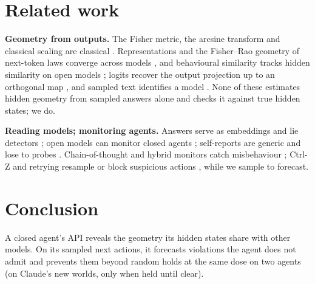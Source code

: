 \documentclass{article}
\theoremstyle{plain}
\theoremstyle{definition}
\begin{document}
\section{Related work}
\label{sec:related}
\textbf{Geometry from outputs.} The Fisher metric, the arcsine transform and classical scaling are classical \citep{cencov1982statistical,amari2016information,anscombe1948transformation,torgerson1952mds}. Representations and the Fisher--Rao geometry of next-token laws converge across models \citep{huh2024platonic,picozzi2026information}, and behavioural similarity tracks hidden similarity on open models \citep{schiekiera2026associations}; logits recover the output projection up to an orthogonal map \citep{finlayson2024logits,carlini2024stealing}, and sampled text identifies a model \citep{pasquini2024llmmap,gao2024model}. None of these estimates hidden geometry from sampled answers alone and checks it against true hidden states; we do.

\textbf{Reading models; monitoring agents.} Answers serve as embeddings \citep{benara2024crafting} and lie detectors \citep{pacchiardi2024liar,cooney2026didyoulie,sam2025quere}; open models can monitor closed agents \citep{conti2026hermeneutics,zhao2026proxy}; self-reports are generic and lose to probes \citep{blandfort2026strangers,advani2026reading,binder2025looking}. Chain-of-thought and hybrid monitors catch misbehaviour \citep{baker2025monitoring,korbak2025cot,arnav2025redhanded,parrack2025blacktowhite}; Ctrl-Z and retrying resample or block suspicious actions \citep{bhatt2025ctrlz,lucassen2026retrying}, while we sample to forecast.

\section{Conclusion}
A closed agent's API reveals the geometry its hidden states share with other models. On its sampled next actions, it forecasts violations the agent does not admit and prevents them beyond random holds at the same dose on two agents (on Claude's new worlds, only when held until clear).
\end{document}
